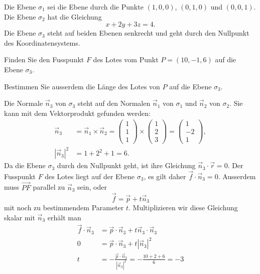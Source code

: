 Die Ebene $\sigma_1$ sei die Ebene durch die Punkte $(1,0,0)$,
$(0,1,0)$ und $(0,0,1)$.
Die Ebene $\sigma_2$ hat die Gleichung
\[
x+2y+3z=4.
\]
Die Ebene $\sigma_3$ steht auf beiden Ebenen senkrecht und geht
durch den Nullpunkt des Koordinatensystems.
\begin{teilaufgaben}
\item
Finden Sie den Fusspunkt $F$ des Lotes vom Punkt $P=(10,-1,6)$ auf die
Ebene $\sigma_3$.
\item
Bestimmen Sie ausserdem die Länge des Lotes von $P$ auf die Ebene $\sigma_3$.
\end{teilaufgaben}

\begin{loesung}
\begin{teilaufgaben}
\item
Die Normale $\vec n_3$ von $\sigma_3$ steht auf den Normalen
$\vec n_1$ von $\sigma_1$ und $\vec n_2$ von $\sigma_2$.
Sie kann mit dem Vektorprodukt gefunden werden:
\begin{align*}
\vec n_3
&=
\vec n_1 \times \vec n_2
=
\begin{pmatrix}1\\1\\1\end{pmatrix}
\times
\begin{pmatrix}1\\2\\3\end{pmatrix}
=
\begin{pmatrix}
1\\-2\\1
\end{pmatrix},
\\
|\vec n_3|^2
&=
1+2^2 + 1=6.
\end{align*}
Da die Ebene $\sigma_3$ durch den Nullpunkt geht, ist ihre Gleichung
$\vec n_3\cdot\vec r=0$.
Der Fusspunkt $F$ des Lotes liegt auf der Ebene $\sigma_3$, es gilt
daher $\vec f\cdot \vec n_3 = 0$.
Ausserdem muss $\overrightarrow{PF}$ parallel zu $\vec n_3$ sein,
oder 
\[
\vec f = \vec p + t\vec n_3
\]
mit noch zu bestimmendem  Parameter $t$.
Multiplizieren wir diese Gleichung skalar mit $\vec n_3$ erhält man
\begin{align*}
\vec f\cdot \vec n_3
&=
\vec p\cdot\vec n_3 + t\vec n_3\cdot\vec n_3
\\
0
&=
\vec p\cdot\vec n_3 + t|\vec n_3|^2
\\
t
&=
-\frac{\vec p\cdot\vec n_3}{|\vec n_3|^2}
=
-\frac{10+2+6}{6}=-3
\end{align*}

\end{teilaufgaben}
\end{loesung}
